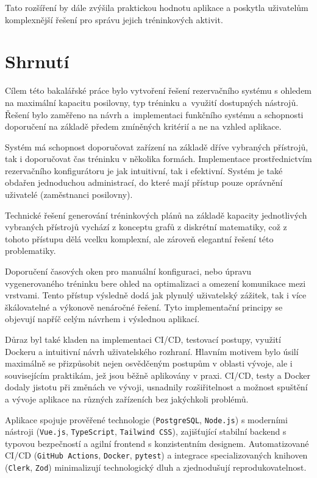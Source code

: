 Tato rozšíření by dále zvýšila praktickou hodnotu aplikace a poskytla uživatelům komplexnější řešení pro správu jejich tréninkových aktivit.

\section{Shrnutí}
Cílem této bakalářské práce bylo vytvoření řešení rezervačního systému s ohledem na maximální kapacitu posilovny, typ tréninku a~využití dostupných nástrojů. Řešení bylo zaměřeno na návrh a~implementaci funkčního systému a schopnosti doporučení na základě předem zmíněných kritérií a ne na vzhled aplikace. 

Systém má schopnost doporučovat zařízení na základě dříve vybraných přístrojů, tak i doporučovat čas tréninku v několika formách. Implementace prostřednictvím rezervačního konfigurátoru je jak intuitivní, tak i efektivní. Systém je také obdařen jednoduchou administrací, do které mají přístup pouze oprávnění uživatelé (zaměstnanci posilovny). 

Technické řešení generování tréninkových plánů na základě kapacity jednotlivých vybraných přístrojů vychází z konceptu grafů z diskrétní matematiky, což z tohoto přístupu dělá vcelku komplexní, ale zároveň elegantní řešení této problematiky.

Doporučení časových oken pro manuální konfiguraci, nebo úpravu vygenerovaného tréninku bere ohled na optimalizaci a omezení komunikace mezi vrstvami. Tento přístup výsledně dodá jak plynulý uživatelský zážitek, tak i více škálovatelné a výkonově nenáročné řešení. Tyto implementační principy se objevují napříč celým návrhem i výslednou aplikací.

Důraz byl také kladen na implementaci CI/CD, testovací postupy, využití Dockeru a intuitivní návrh uživatelského rozhraní. Hlavním motivem bylo úsilí maximálně se přizpůsobit nejen osvědčeným postupům v oblasti vývoje, ale i souvisejícím praktikám, jež jsou běžně aplikovány v praxi. CI/CD, testy a Docker dodaly jistotu při změnách ve vývoji, usnadnily rozšiřitelnost a možnost spuštění a vývoje aplikace na různých zařízeních bez jakýchkoli problémů. 

Aplikace spojuje prověřené technologie (\texttt{PostgreSQL}, \texttt{Node.js}) s moderními nástroji (\texttt{Vue.js}, \texttt{TypeScript}, \texttt{Tailwind CSS}), zajišťující stabilní backend s typovou bezpečností a agilní frontend s konzistentním designem. Automatizované CI/CD (\texttt{GitHub Actions}, \texttt{Docker}, \texttt{pytest}) a integrace specializovaných knihoven (\texttt{Clerk}, \texttt{Zod}) minimalizují technologický dluh a zjednodušují reprodukovatelnost.

